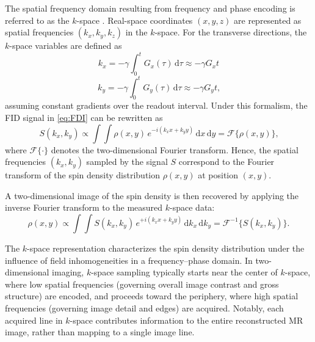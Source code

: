     The spatial frequency domain resulting from frequency and phase encoding is referred to as the $k$-space \citep{mansfieldNMRDiffractionSolids1973, twiegKtrajectoryFormulationNMR1983}. Real-space coordinates $(x,y,z)$ are represented as spatial frequencies $(k_x,k_y,k_z)$ in the $k$-space. For the transverse directions, the $k$-space variables are defined as
    \begin{equation}
        k_x = -\gamma \int_0^t G_x(\tau)\,\text{d}\tau \approx -\gamma G_x t
    \end{equation}
    \begin{equation}
        k_y = -\gamma \int_0^t G_y(\tau)\,\text{d}\tau \approx -\gamma G_y t\text{,}
    \end{equation}
    assuming constant gradients over the readout interval. Under this formalism, the FID signal in \eqref{eq:FDI} can be rewritten as
\begin{equation}
    S(k_x,k_y) \propto \int \!\!\!\int \rho(x,y)\, e^{-i\left(k_x x + k_y y\right)} \,\text{d}x\,\text{d}y
    = \mathcal{F}\{\rho(x,y)\}\text{,}
    \label{eq:FDI2}
\end{equation}
where $\mathcal{F}\{\cdot\}$ denotes the two-dimensional Fourier transform. Hence, the spatial frequencies $(k_x,k_y)$ sampled by the signal $S$ correspond to the Fourier transform of the spin density distribution $\rho(x,y)$ at position $(x,y)$. 

A two-dimensional image of the spin density is then recovered by applying the inverse Fourier transform to the measured $k$-space data:
    \begin{equation}
    \rho(x,y) \propto \int \!\!\!\int S(k_x,k_y)\, e^{+i\left(k_x x + k_y y\right)} \,\text{d}k_x\,\text{d}k_y
    = \mathcal{F}^{-1}\{S(k_x,k_y)\}\text{.}
    \end{equation}

The $k$-space representation characterizes the spin density distribution under the influence of field inhomogeneities in a frequency–phase domain. In two-dimensional imaging, $k$-space sampling typically starts near the center of $k$-space, where low spatial frequencies (governing overall image contrast and gross structure) are encoded, and proceeds toward the periphery, where high spatial frequencies (governing image detail and edges) are acquired. Notably, each acquired line in $k$-space contributes information to the entire reconstructed MR image, rather than mapping to a single image line.



